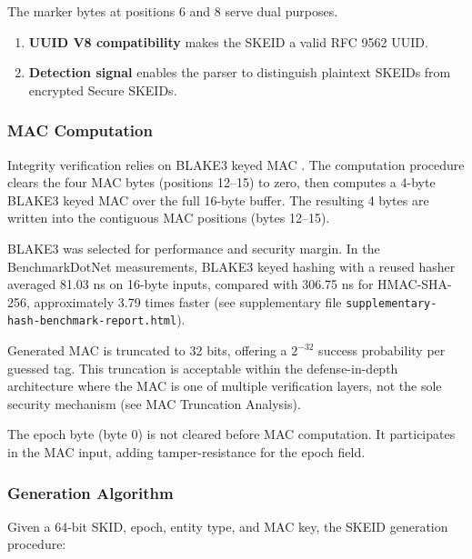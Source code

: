\documentclass[a4paper,fleqn]{cas-sc}
\providecommand{\tightlist}{%
  \setlength{\itemsep}{0pt}\setlength{\parskip}{0pt}}
\begin{document}
The marker bytes at positions 6 and 8 serve dual purposes.

\begin{enumerate}
\def\labelenumi{\arabic{enumi}.}
\tightlist
\item
  \textbf{UUID V8 compatibility} makes the SKEID a valid RFC 9562 UUID.
\item
  \textbf{Detection signal} enables the parser to distinguish plaintext
  SKEIDs from encrypted Secure SKEIDs.
\end{enumerate}

\subsubsection{MAC Computation}\label{mac-computation}

Integrity verification relies on BLAKE3 keyed MAC \citep{blake3}. The
computation procedure clears the four MAC bytes (positions 12--15) to
zero, then computes a 4-byte BLAKE3 keyed MAC over the full 16-byte
buffer. The resulting 4 bytes are written into the contiguous MAC
positions (bytes 12--15).

BLAKE3 was selected for performance and security margin. In the
BenchmarkDotNet measurements, BLAKE3 keyed hashing with a reused hasher
averaged 81.03 ns on 16-byte inputs, compared with 306.75 ns for
HMAC-SHA-256, approximately 3.79 times faster (see supplementary file
\texttt{supplementary-hash-benchmark-report.html}).

Generated MAC is truncated to 32 bits, offering a \(2^{-32}\) success
probability per guessed tag. This truncation is acceptable within the
defense-in-depth architecture where the MAC is one of multiple
verification layers, not the sole security mechanism (see MAC Truncation
Analysis).

The epoch byte (byte 0) is not cleared before MAC computation. It
participates in the MAC input, adding tamper-resistance for the epoch
field.

\subsubsection{Generation Algorithm}\label{generation-algorithm-1}

Given a 64-bit SKID, epoch, entity type, and MAC key, the SKEID
generation procedure:
\end{document}
